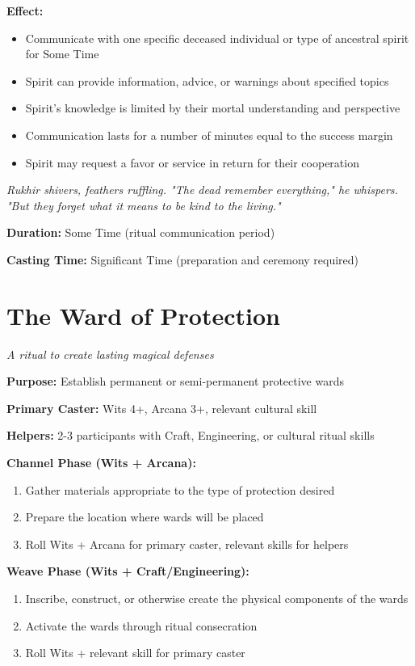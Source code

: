 \documentclass[12pt,twoside]{book}
\newcommand{\shadow}[1]{\textit{#1}}
\begin{document}
\textbf{Effect:}
\begin{itemize}
\item Communicate with one specific deceased individual or type of ancestral spirit for Some Time
\item Spirit can provide information, advice, or warnings about specified topics
\item Spirit's knowledge is limited by their mortal understanding and perspective
\item Communication lasts for a number of minutes equal to the success margin
\item Spirit may request a favor or service in return for their cooperation
\end{itemize}

\shadow{Rukhir shivers, feathers ruffling. "The dead remember everything," he whispers. "But they forget what it means to be kind to the living."}

\textbf{Duration:} Some Time (ritual communication period)

\textbf{Casting Time:} Significant Time (preparation and ceremony required)

\section*{The Ward of Protection}
\textit{A ritual to create lasting magical defenses}

\textbf{Purpose:} Establish permanent or semi-permanent protective wards

\textbf{Primary Caster:} Wits 4+, Arcana 3+, relevant cultural skill

\textbf{Helpers:} 2-3 participants with Craft, Engineering, or cultural ritual skills

\textbf{Channel Phase (Wits + Arcana):}
\begin{enumerate}
\item Gather materials appropriate to the type of protection desired
\item Prepare the location where wards will be placed
\item Roll Wits + Arcana for primary caster, relevant skills for helpers
\end{enumerate}

\textbf{Weave Phase (Wits + Craft/Engineering):}
\begin{enumerate}
\item Inscribe, construct, or otherwise create the physical components of the wards
\item Activate the wards through ritual consecration
\item Roll Wits + relevant skill for primary caster
\end{enumerate}
\end{document}
